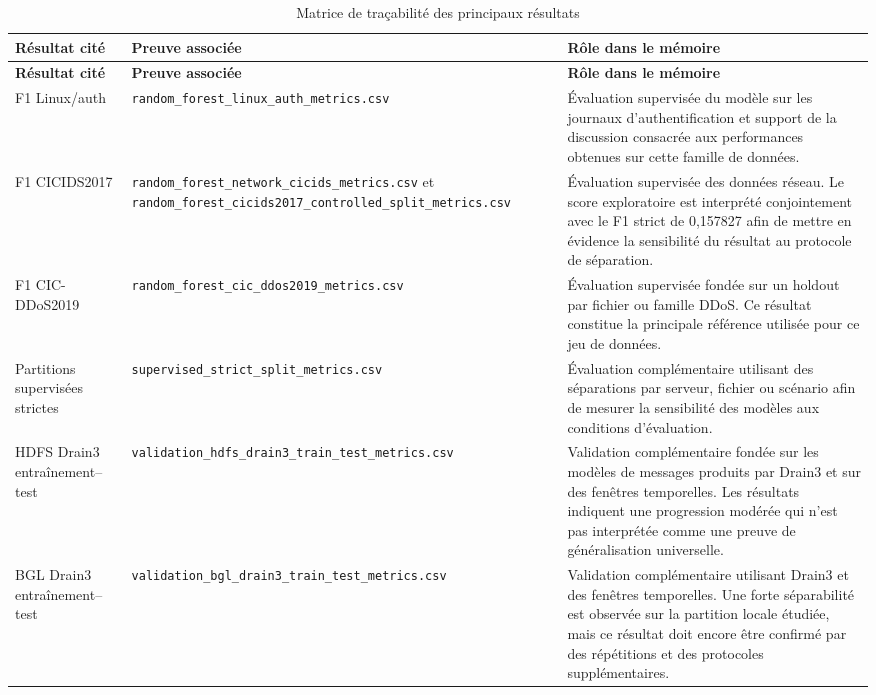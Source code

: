 \begin{longtable}{p{3.2cm}p{4.2cm}p{5.5cm}}

\caption{Matrice de traçabilité des principaux résultats}
\label{tab:matrice-tracabilite}\\

\toprule
\textbf{Résultat cité} &
\textbf{Preuve associée} &
\textbf{Rôle dans le mémoire} \\
\midrule
\endfirsthead

\toprule
\textbf{Résultat cité} &
\textbf{Preuve associée} &
\textbf{Rôle dans le mémoire} \\
\midrule
\endhead

F1 Linux/auth &
\texttt{random\_forest\_linux\_auth\_metrics.csv} &
Évaluation supervisée du modèle sur les journaux d'authentification et support de la discussion consacrée aux performances obtenues sur cette famille de données. \\

F1 CICIDS2017 &
\texttt{random\_forest\_network\_cicids\_metrics.csv} et
\texttt{random\_forest\_cicids2017\_controlled\_split\_metrics.csv} &
Évaluation supervisée des données réseau. Le score exploratoire est interprété conjointement avec le F1 strict de 0,157827 afin de mettre en évidence la sensibilité du résultat au protocole de séparation. \\

F1 CIC-DDoS2019 &
\texttt{random\_forest\_cic\_ddos2019\_metrics.csv} &
Évaluation supervisée fondée sur un holdout par fichier ou famille DDoS. Ce résultat constitue la principale référence utilisée pour ce jeu de données. \\

Partitions supervisées strictes &
\texttt{supervised\_strict\_split\_metrics.csv} &
Évaluation complémentaire utilisant des séparations par serveur, fichier ou scénario afin de mesurer la sensibilité des modèles aux conditions d'évaluation. \\

HDFS Drain3 entraînement--test &
\texttt{validation\_hdfs\_drain3\_train\_test\_metrics.csv} &
Validation complémentaire fondée sur les modèles de messages produits par Drain3 et sur des fenêtres temporelles. Les résultats indiquent une progression modérée qui n'est pas interprétée comme une preuve de généralisation universelle. \\

BGL Drain3 entraînement--test &
\texttt{validation\_bgl\_drain3\_train\_test\_metrics.csv} &
Validation complémentaire utilisant Drain3 et des fenêtres temporelles. Une forte séparabilité est observée sur la partition locale étudiée, mais ce résultat doit encore être confirmé par des répétitions et des protocoles supplémentaires. \\


\end{longtable}
